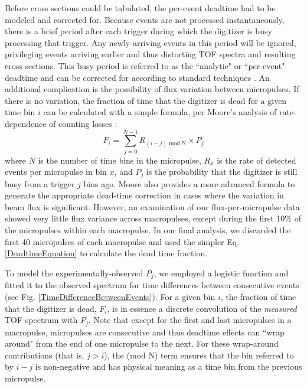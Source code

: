 \documentclass[twocolumn,secnumarabic,amssymb, nobibnotes, aps, prl,
superscriptaddress, nobalancelastpage]{revtex4}
\begin{document}
Before cross sections could be tabulated, the per-event deadtime had to be
modeled and corrected for. Because events are not processed
instantaneously, there is a brief period
after each trigger during which the digitizer is busy processing that trigger.
Any newly-arriving events in this period will be ignored,
privileging events arriving earlier and thus distorting
TOF spectra and resulting cross sections. This busy period is referred to as the
``analytic" or ``per-event" deadtime and can be corrected for according to standard 
techniques
\cite{Moore1980}. An additional complication is the possibility of flux
variation between micropulses. If there is no variation, the fraction of time
that the digitizer is dead for a given time bin $i$ can be calculated with a
simple formula, per Moore's analysis of rate-dependence of counting losses
\cite{Moore1980}:
\begin{equation}
    F_{i} = \sum^{N-1}_{j=0} R_{(i-j)\text{ mod N}}\times P_{j}
    \label{DeadtimeEquation}
\end{equation}
where $N$ is the number of time bins in the micropulse, $R_{x}$ is the rate of
detected events per micropulse in bin $x$, and $P_{j}$ is the probability that the
digitizer is still busy from a trigger $j$ bins ago.
Moore also provides a more advanced formula to generate the appropriate
dead-time correction in cases where the variation in beam flux 
is significant. However, an examination of our flux-per-micropulse data showed
very little flux variance across macropulses, except during the first 10\%
of the micropulses within each macropulse. In our final analysis, we discarded 
the first 40 micropulses of each 
macropulse and used the simpler Eq. \ref{DeadtimeEquation} to calculate the dead
time fraction.

To model the experimentally-observed $P_{j}$, we
employed a logistic function and fitted it to the observed spectrum for time
differences between consecutive events (see Fig.
\ref{TimeDifferenceBetweenEvents}). For a given bin $i$, the fraction of time that the 
digitizer is dead, $F_{i}$, is in essence a discrete convolution of the
\textit{measured} TOF spectrum with $P_{j}$. Note that except for the first and
last micropulses in a macropulse, micropulses are consecutive and thus deadtime effects can
``wrap around" from the end of one micropulse to the next. For these wrap-around
contributions (that is, $j>i$), the (mod N) term ensures that the bin referred
to by $i-j$ is non-negative and has physical meaning as a time bin from the 
previous micropulse.
\end{document}
